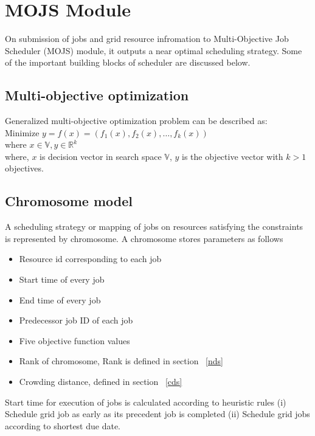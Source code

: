 \section{MOJS Module}
On submission of jobs and grid resource infromation to Multi-Objective Job Scheduler (MOJS) module, it outputs a near optimal scheduling strategy. Some of the important building blocks of scheduler are discussed below.
\subsection{Multi-objective optimization}
Generalized multi-objective optimization problem can be described as:\\
Minimize $y = f(x) = (f_1(x),f_2(x),\ldots,f_k(x))$\\
where $x \in \mathbb{V}, y \in \mathbb{R}^k$\\
where, $x$ is decision vector in search space $\mathbb{V}$, $y$ is the objective vector with $k > 1$ objectives.
\subsection{Chromosome model}
A scheduling strategy or mapping of jobs on resources satisfying the constraints is represented by  chromosome. A chromosome stores parameters as follows 
\begin {itemize}
\item Resource id corresponding to each job
\item Start time of every job
\item End time of every job
\item Predecessor job ID of each job 
\item Five objective function values 
\item Rank of chromosome, Rank is defined in section ~\ref{nds} 
\item Crowding distance, defined in section ~\ref{cds} 
\end{itemize}
Start time for execution of jobs is calculated according to heuristic rules (i) Schedule grid job as early as its precedent job is completed (ii) Schedule grid jobs according to shortest due date.
